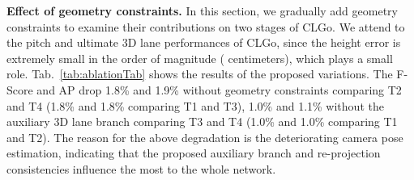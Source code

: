 \documentclass[letterpaper]{article} \usepackage{aaai22}  \usepackage{times}  \usepackage{helvet}  \usepackage{courier}  \usepackage[hyphens]{url}  \usepackage{graphicx} \urlstyle{rm} \def\UrlFont{\rm}  \usepackage{natbib}  \usepackage{caption}
\begin{document}
\begin{table}[t]
\begin{center}
\caption{Evaluation of losses for two stages on SVV~(\%).}
\label{tab:ablationTab}
\end{center}
\vspace{-0.5em}
\end{table}
\noindent \textbf{Effect of geometry constraints.}
In this section, we gradually add geometry constraints to examine their contributions on two stages of CLGo. We attend to the pitch and ultimate 3D lane performances of CLGo, since the height error is extremely small in the order of magnitude ( centimeters), which plays a small role.
Tab.~\ref{tab:ablationTab} shows the results of the proposed variations. The F-Score and AP drop 1.8\% and 1.9\% without geometry constraints comparing T2 and T4 (1.8\% and 1.8\% comparing T1 and T3), 1.0\% and 1.1\% without the auxiliary 3D lane branch comparing T3 and T4 (1.0\% and 1.0\% comparing T1 and T2). The reason for the above degradation is the deteriorating camera pose estimation, indicating that the proposed auxiliary branch and re-projection consistencies influence the most to the whole network.
\end{document}
